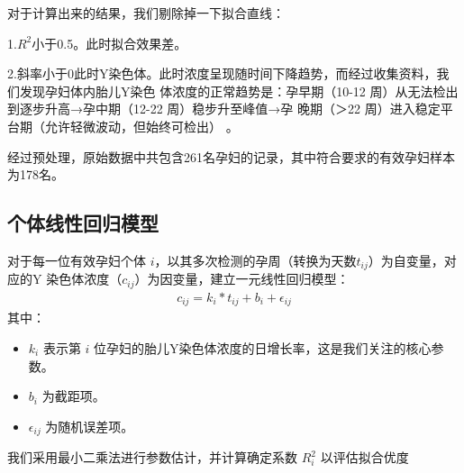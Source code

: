 \documentclass{article}
\begin{document}
对于计算出来的结果，我们剔除掉一下拟合直线：

1.$R^2$小于0.5。此时拟合效果差。

2.斜率小于0此时Y染色体。此时浓度呈现随时间下降趋势，而经过收集资料，我们发现孕妇体内胎儿Y染色
体浓度的正常趋势是：孕早期（10-12 周）从无法检出到逐步升高→孕中期（12-22 周）稳步升至峰值→孕
晚期（＞22 周）进入稳定平台期（允许轻微波动，但始终可检出） 。

经过预处理，原始数据中共包含261名孕妇的记录，其中符合要求的有效孕妇样本为178名。
\subsection{个体线性回归模型}
对于每一位有效孕妇个体 $i$，以其多次检测的孕周（转换为天数$t_{ij}$）为自变量，对应的Y
染色体浓度（$c_{ij}$）为因变量，建立一元线性回归模型：
\begin{gather}
    c_{ij}=k_i*t_{ij}+b_i+\epsilon_{ij} \tag{1}
\end{gather}
其中：
\begin{itemize}
    \item $k_i$ 表示第 $i$ 位孕妇的胎儿Y染色体浓度的日增长率，这是我们关注的核心参数。
    \item $b_i$ 为截距项。
    \item $\epsilon_{ij}$ 为随机误差项。
\end{itemize}
我们采用最小二乘法进行参数估计，并计算确定系数 $R^2_i$ 以评估拟合优度
\end{document}
